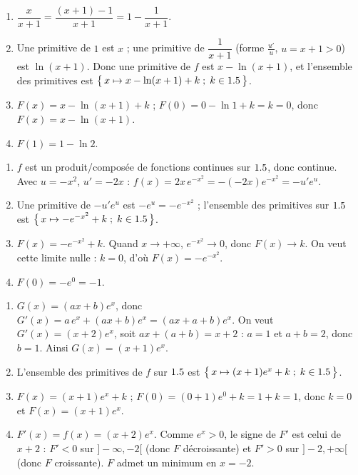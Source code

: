\begin{enumerate}[label=\arabic*)]
\item $\dfrac{x}{x+1}=\dfrac{(x+1)-1}{x+1}=1-\dfrac{1}{x+1}$.
\item Une primitive de $1$ est $x$ ; une primitive de $\dfrac1{x+1}$ (forme $\frac{u'}{u}$, $u=x+1>0$)
est $\ln(x+1)$. Donc une primitive de $f$ est $x-\ln(x+1)$, et l'ensemble des primitives est
$\big\{\,x\mapsto x-\ln(x+1)+k\;;\;k\in1.5\,\big\}$.
\item $F(x)=x-\ln(x+1)+k$ ; $F(0)=0-\ln1+k=k=0$, donc $F(x)=x-\ln(x+1)$.
\item $F(1)=1-\ln 2$.
\end{enumerate}

\begin{enumerate}[label=\arabic*)]
\item $f$ est un produit/composée de fonctions continues sur $1.5$, donc continue.
Avec $u=-x^{2}$, $u'=-2x$ : $f(x)=2x\,e^{-x^{2}}=-(-2x)e^{-x^{2}}=-u'e^{u}$.
\item Une primitive de $-u'e^{u}$ est $-e^{u}=-e^{-x^{2}}$ ; l'ensemble des primitives sur $1.5$ est
$\big\{\,x\mapsto-e^{-x^{2}}+k\;;\;k\in1.5\,\big\}$.
\item $F(x)=-e^{-x^{2}}+k$. Quand $x\to+\infty$, $e^{-x^{2}}\to0$, donc $F(x)\to k$.
On veut cette limite nulle : $k=0$, d'où $F(x)=-e^{-x^{2}}$.
\item $F(0)=-e^{0}=-1$.
\end{enumerate}

\begin{enumerate}[label=\arabic*)]
\item $G(x)=(ax+b)e^{x}$, donc $G'(x)=a\,e^{x}+(ax+b)e^{x}=(ax+a+b)e^{x}$.
On veut $G'(x)=(x+2)e^{x}$, soit $ax+(a+b)=x+2$ : $a=1$ et $a+b=2$, donc $b=1$.
Ainsi $G(x)=(x+1)e^{x}$.
\item L'ensemble des primitives de $f$ sur $1.5$ est $\big\{\,x\mapsto(x+1)e^{x}+k\;;\;k\in1.5\,\big\}$.
\item $F(x)=(x+1)e^{x}+k$ ; $F(0)=(0+1)e^{0}+k=1+k=1$, donc $k=0$ et $F(x)=(x+1)e^{x}$.
\item $F'(x)=f(x)=(x+2)e^{x}$. Comme $e^{x}>0$, le signe de $F'$ est celui de $x+2$ :
$F'<0$ sur $]-\infty,-2[$ (donc $F$ décroissante) et $F'>0$ sur $]-2,+\infty[$ (donc $F$ croissante).
$F$ admet un minimum en $x=-2$.
\end{enumerate}

